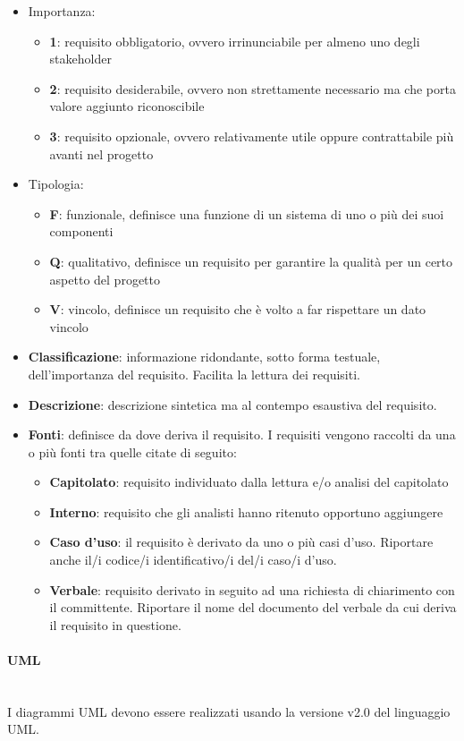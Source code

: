 \begin{itemize}
		\item Importanza:
		\begin{itemize}
			\item \textbf{1}: requisito obbligatorio, ovvero irrinunciabile per almeno uno degli stakeholder
			\item \textbf{2}: requisito desiderabile, ovvero non strettamente necessario ma che porta valore aggiunto riconoscibile
			\item \textbf{3}: requisito opzionale, ovvero relativamente utile oppure contrattabile più avanti nel progetto
		\end{itemize}
		\item Tipologia:
		\begin{itemize}
			\item \textbf{F}: funzionale, definisce una funzione di un sistema di uno o più dei suoi componenti
			\item \textbf{Q}: qualitativo, definisce un requisito per garantire la qualità per un certo aspetto del progetto
			\item \textbf{V}: vincolo, definisce un requisito che è volto a far rispettare un dato vincolo
		\end{itemize}
	\item \textbf{Classificazione}: informazione ridondante, sotto forma testuale, dell’importanza del requisito. Facilita la lettura dei requisiti.
	\item \textbf{Descrizione}: descrizione sintetica ma al contempo esaustiva del requisito.
	\item \textbf{Fonti}: definisce da dove deriva il requisito. I requisiti vengono raccolti da una o più fonti tra quelle citate di seguito:
	\begin{itemize}
		\item \textbf{Capitolato}: requisito individuato dalla lettura e/o analisi del capitolato
		\item \textbf{Interno}: requisito che gli analisti hanno ritenuto opportuno aggiungere
		\item \textbf{Caso d’uso}: il requisito è derivato da uno o più casi d’uso. Riportare anche il/i codice/i identificativo/i del/i caso/i d’uso.
		\item \textbf{Verbale}: requisito derivato in seguito ad una richiesta di chiarimento con il committente. Riportare il nome del documento del verbale da cui deriva il requisito in questione.		
	\end{itemize}
\end{itemize}
\paragraph{UML}\mbox{}\\
I diagrammi UML devono essere realizzati usando la versione v2.0 del linguaggio UML.

